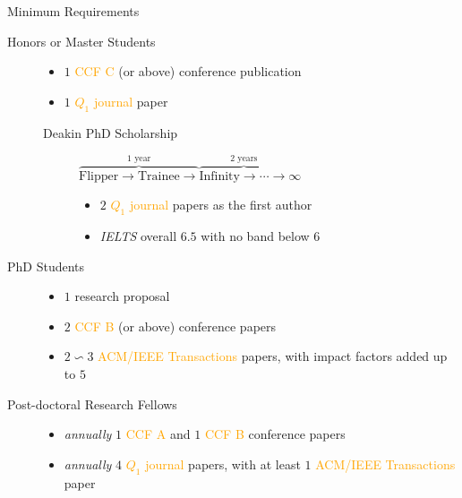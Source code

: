 \begin{slide}{Minimum Requirements}
\begin{description}
\item[Honors or Master Students]
    \begin{itemize}
        \item $1$ \textcolor{orange}{CCF C} (or above) conference publication
        \item $1$ \textcolor{orange}{$Q_1$ journal} paper
    \end{itemize}
    \begin{description}
  		\item[Deakin PhD Scholarship]
$\overbrace{\text{Flipper} \rightarrow \text{Trainee} \rightarrow}^{\text{1 year}}
\overbrace{\text{Infinity} \rightarrow \cdots \rightarrow }^{\text{2 years}} \infty$
    		\begin{itemize}
        		\item $2$ \textcolor{orange}{$Q_1$ journal} papers as the first author
        		\item \textit{IELTS} overall $6.5$ with no band below $6$
    		\end{itemize}
	\end{description}


\item[PhD Students]
    \begin{itemize}
        \item $1$ research proposal
        \item $2$ \textcolor{orange}{CCF B} (or above) conference papers
        \item $2 \backsim 3$ \textcolor{orange}{ACM/IEEE Transactions} papers,
        with impact factors added up to $5$
    \end{itemize}

\item[Post-doctoral Research Fellows]
    \begin{itemize}
    \item \textit{annually} $1$ \textcolor{orange}{CCF A} and $1$ \textcolor{orange}{CCF B} conference papers
    \item \textit{annually} $4$ \textcolor{orange}{$Q_1$ journal} papers,
     with at least $1$ \textcolor{orange}{ACM/IEEE Transactions} paper
    \end{itemize}

\end{description}
\end{slide}
